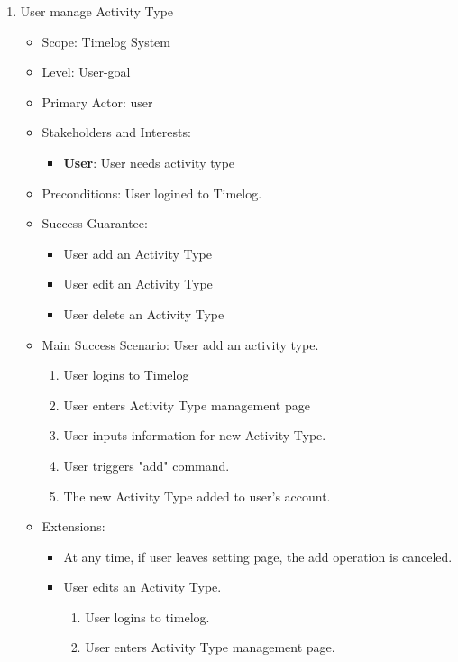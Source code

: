 \documentclass[12pt, a4paper]{article}
\begin{document}
\begin{CJK*}{UTF8}{bkai}
\begin{enumerate}
      \item User manage Activity Type
        \begin{itemize}
          \item Scope: Timelog System
          \item Level: User-goal
          \item Primary Actor: user
          \item Stakeholders and Interests:
            \begin{itemize}
              \item {\bf User}: User needs activity type
            \end{itemize}
          \item Preconditions: User logined to Timelog.
          \item Success Guarantee:
            \begin{itemize}
              \item User add an Activity Type
              \item User edit an Activity Type
              \item User delete an Activity Type
            \end{itemize}
          \item Main Success Scenario: User add an activity type.
            \begin{enumerate}
              \item User logins to Timelog
              \item User enters Activity Type management page
              \item User inputs information for new Activity Type.
              \item User triggers "add" command.
              \item The new Activity Type added to user's account.
            \end{enumerate}
          \item Extensions:
            \begin{itemize}
              \item At any time, if user leaves setting page, the add operation is canceled.
              \item User edits an Activity Type.
                \begin{enumerate}
                  \item User logins to timelog.
                  \item User enters Activity Type management page.

\end{enumerate}
\end{itemize}
\end{itemize}
\end{enumerate}
\end{CJK*}
\end{document}
